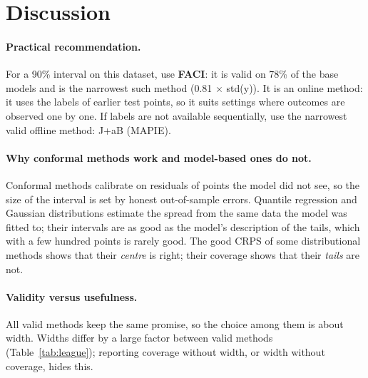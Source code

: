 \documentclass[11pt]{article}
\begin{document}
\FloatBarrier
\section{Discussion}\label{sec:discussion}
\paragraph{Practical recommendation.} For a 90\% interval on this dataset, use \textbf{FACI}: it is valid on 78\% of the base models and is the narrowest such method (0.81 $\times$ std(y)). It is an online method: it uses the labels of earlier test points, so it suits settings where outcomes are observed one by one. If labels are not available sequentially, use the narrowest valid offline method: J+aB (MAPIE).
\paragraph{Why conformal methods work and model-based ones do not.} Conformal methods calibrate on residuals of points the model did not
see, so the size of the interval is set by honest out-of-sample errors. Quantile regression and Gaussian distributions estimate the spread
from the same data the model was fitted to; their intervals are as good as the model's description of the tails, which with a few hundred
points is rarely good. The good CRPS of some distributional methods shows that their \emph{centre} is right; their coverage shows that their
\emph{tails} are not.
\paragraph{Validity versus usefulness.} All valid methods keep the same promise, so the choice among them is about width. Widths differ by
a large factor between valid methods (Table~\ref{tab:league}); reporting coverage without width, or width without coverage, hides this.
\end{document}
